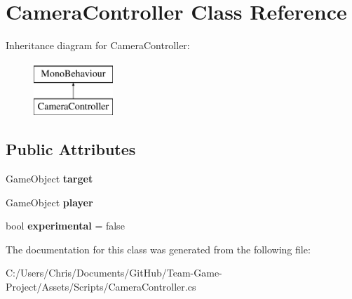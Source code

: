 \hypertarget{class_camera_controller}{}\section{Camera\+Controller Class Reference}
\label{class_camera_controller}
Inheritance diagram for Camera\+Controller\+:\begin{figure}[H]
\begin{center}
\leavevmode
\includegraphics[height=2.000000cm]{class_camera_controller}
\end{center}
\end{figure}
\subsection*{Public Attributes}
\begin{DoxyCompactItemize}
\item 
Game\+Object {\bfseries target}\hypertarget{class_camera_controller_a2a671c90de07af1a4f8b7530268e9f3a}{}\label{class_camera_controller_a2a671c90de07af1a4f8b7530268e9f3a}

\item 
Game\+Object {\bfseries player}\hypertarget{class_camera_controller_aae794ec2d17947f671ce0eaef9aac8b7}{}\label{class_camera_controller_aae794ec2d17947f671ce0eaef9aac8b7}

\item 
bool {\bfseries experimental} = false\hypertarget{class_camera_controller_a3bf01b53e04f17060497fe29a1b5178a}{}\label{class_camera_controller_a3bf01b53e04f17060497fe29a1b5178a}

\end{DoxyCompactItemize}


The documentation for this class was generated from the following file\+:\begin{DoxyCompactItemize}
\item 
C\+:/\+Users/\+Chris/\+Documents/\+Git\+Hub/\+Team-\/\+Game-\/\+Project/\+Assets/\+Scripts/Camera\+Controller.\+cs\end{DoxyCompactItemize}
